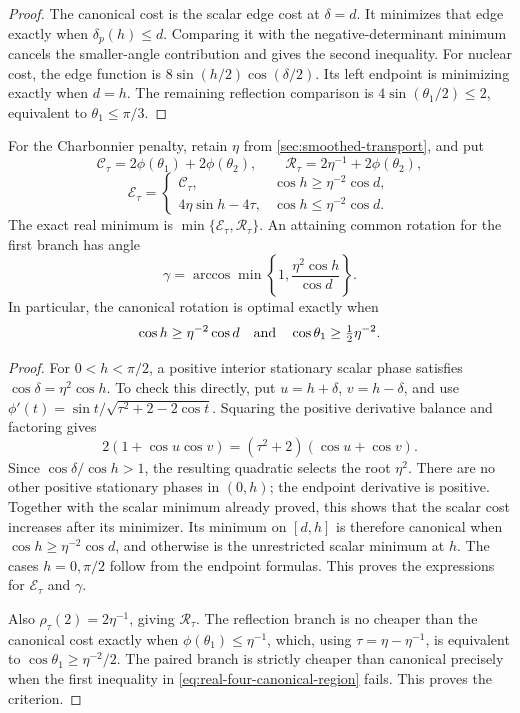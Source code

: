 \begin{proof}
The canonical cost is the scalar edge cost at $\delta=d$. It minimizes
that edge exactly when $\delta_p(h)\leq d$. Comparing it with the
negative-determinant minimum cancels the smaller-angle contribution and
gives the second inequality. For nuclear cost, the edge function is
$8\sin(h/2)\cos(\delta/2)$. Its left endpoint is minimizing exactly
when $d=h$. The remaining reflection comparison is
$4\sin(\theta_1/2)\leq2$, equivalent to $\theta_1\leq\pi/3$.
\end{proof}

\begin{corollary}
\label{cor:real-four-smoothed}
For the Charbonnier penalty, retain $\eta$ from
\cref{sec:smoothed-transport}, and put
\[
 \mathcal C_\tau=2\phi(\theta_1)+2\phi(\theta_2),\qquad
 \mathcal R_\tau=2\eta^{-1}+2\phi(\theta_2),
\]
\[
 \mathcal E_\tau=
 \begin{cases}
  \mathcal C_\tau,&\cos h\geq\eta^{-2}\cos d,\\
  4\eta\sin h-4\tau,&\cos h\leq\eta^{-2}\cos d.
 \end{cases}
\]
The exact real minimum is $\min\{\mathcal E_\tau,\mathcal R_\tau\}$.
An attaining common rotation for the first branch has angle
\[
 \gamma=\arccos\min\left\{1,\frac{\eta^2\cos h}{\cos d}\right\}.
\]
In particular, the canonical rotation is optimal exactly when
\begin{equation}
 \cos h\geq\eta^{-2}\cos d
 \quad\hbox{and}\quad
 \cos\theta_1\geq\tfrac12\eta^{-2}.
 \label{eq:real-four-canonical-region}
\end{equation}
\end{corollary}

\begin{proof}
For $0<h<\pi/2$, a positive interior stationary scalar phase satisfies
$\cos\delta=\eta^2\cos h$. To check this directly, put
$u=h+\delta$, $v=h-\delta$, and use
$\phi'(t)=\sin t/\sqrt{\tau^2+2-2\cos t}$.
Squaring the positive derivative balance and factoring gives
\[
 2(1+\cos u\cos v)=(\tau^2+2)(\cos u+\cos v).
\]
Since $\cos\delta/\cos h>1$, the resulting quadratic selects the root
$\eta^2$. There are no other positive stationary phases in $(0,h)$;
the endpoint derivative is positive. Together with the scalar minimum
already proved, this shows that the scalar cost increases after its
minimizer. Its minimum on $[d,h]$ is therefore canonical when
$\cos h\geq\eta^{-2}\cos d$, and otherwise is the unrestricted
scalar minimum at $h$. The cases $h=0,\pi/2$ follow from the endpoint
formulas. This proves the expressions for $\mathcal E_\tau$ and
$\gamma$.

Also $\rho_\tau(2)=2\eta^{-1}$, giving $\mathcal R_\tau$.
The reflection branch is no cheaper than the canonical cost exactly when
$\phi(\theta_1)\leq\eta^{-1}$, which, using
$\tau=\eta-\eta^{-1}$, is equivalent to
$\cos\theta_1\geq\eta^{-2}/2$. The paired branch is strictly cheaper
than canonical precisely when the first inequality in
\cref{eq:real-four-canonical-region} fails. This proves the criterion.
\end{proof}

